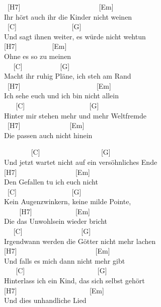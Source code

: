 \documentclass[
  letterpaper,
  twoside=false]{scrbook}
\begin{document}
\hspace*{0.333em} ~{[}H7{]} ~ ~ ~ ~ ~ ~ ~ ~ ~ ~ ~ ~ ~ {[}Em{]}\\
Ihr hört auch ihr die Kinder nicht weinen\\
\hspace*{0.333em} ~{[}C{]} ~ ~ ~ ~ ~ ~ ~ ~ ~ {[}G{]}\\
Und sagt ihnen weiter, es würde nicht wehtun\\
{[}H7{]} ~ ~ ~ ~ ~ ~{[}Em{]}\\
\hspace*{0.333em}Ohne es so zu meinen\\
\hspace*{0.333em} ~ ~{[}C{]} ~ ~ ~ ~ ~ ~ {[}G{]}\\
Macht ihr ruhig Pläne, ich steh am Rand\\
\hspace*{0.333em} ~{[}H7{]} ~ ~ ~ ~ ~ ~ ~ ~ ~ ~ ~ ~ ~{[}Em{]}\\
Ich sehe euch und ich bin nicht allein\\
\hspace*{0.333em} ~ ~ {[}C{]} ~ ~ ~ ~ ~ ~ ~ ~ ~ ~ ~{[}G{]}\\
Hinter mir stehen mehr und mehr Weltfremde\\
\hspace*{0.333em} ~{[}H7{]} ~ ~ ~ ~ ~ ~ ~ ~ {[}Em{]}\\
Die passen auch nicht hinein

~ ~ ~ ~ ~{[}C{]} ~ ~ ~ ~ ~ ~ ~ ~ ~ ~ {[}G{]}\\
Und jetzt wartet nicht auf ein versöhnliches Ende\\
{[}H7{]} ~ ~ ~ ~ ~ ~ ~ ~ ~ ~{[}Em{]}\\
Den Gefallen tu ich euch nicht\\
\hspace*{0.333em} ~{[}C{]} ~ ~ ~ ~ ~ ~ ~ ~ ~ {[}G{]}\\
Kein Augenzwinkern, keine milde Pointe,\\
\hspace*{0.333em} ~ ~ ~{[}H7{]} ~ ~ ~ ~ ~ ~ ~ {[}Em{]}\\
Die das Unwohlsein wieder bricht\\
\hspace*{0.333em} ~ ~{[}C{]} ~ ~ ~ ~ ~ ~ ~ ~ ~ ~{[}G{]}\\
Irgendwann werden die Götter nicht mehr lachen\\
\hspace*{0.333em} {[}H7{]} ~ ~ ~ ~ ~ ~ ~ ~ ~ ~ ~ ~ ~ {[}Em{]}\\
Und falls es mich dann nicht mehr gibt\\
\hspace*{0.333em} ~ ~ {[}C{]} ~ ~ ~ ~ ~ ~ ~ ~ ~ ~ ~ ~ {[}G{]}\\
Hinterlass ich ein Kind, das sich selbst gehört\\
{[}H7{]} ~ ~ ~ ~ ~ ~ ~ ~ ~ ~ ~ ~ {[}Em{]}\\
\hspace*{0.333em} Und dies unhandliche Lied\\
\hspace*{0.333em}
\end{document}
